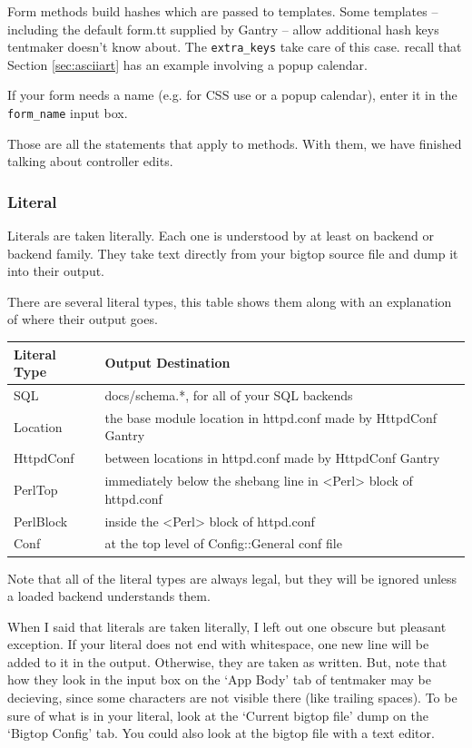 Form methods build hashes which are passed to templates.  Some templates --
including the default form.tt supplied by Gantry -- allow additional
hash keys tentmaker doesn't know about.  The \verb+extra_keys+ take care
of this case. recall that Section \ref{sec:asciiart} has an example involving
a popup calendar.

If your form needs a name (e.g. for CSS use or a popup calendar), enter
it in the \verb+form_name+ input box.

Those are all the statements that apply to methods.  With them, we have
finished talking about controller edits.

\subsubsection*{Literal}

Literals are taken literally.  Each one is understood by at least on backend
or backend family.  They take text directly from your bigtop source file
and dump it into their output.

There are several literal types, this table shows them along with an
explanation of where their output goes.

\begin{tabular}{l|l}
Literal Type & Output Destination \\
\hline
SQL       & docs/schema.*, for all of your SQL backends \\
Location  & the base module location in httpd.conf made by HttpdConf Gantry \\
HttpdConf & between locations in httpd.conf made by HttpdConf Gantry \\
PerlTop   & immediately below the shebang line in <Perl> block of httpd.conf \\
PerlBlock & inside the <Perl> block of httpd.conf \\
Conf      & at the top level of Config::General conf file \\
\end{tabular}

Note that all of the literal types are always legal, but they will be ignored
unless a loaded backend understands them.

When I said that literals are taken literally, I left out one obscure
but pleasant exception.  If your literal does not end with whitespace,
one new line will be added to it in the output.  Otherwise, they are
taken as written.  But, note that how they look in the input box on
the `App Body' tab of tentmaker may be decieving, since some characters
are not visible there (like trailing spaces).  To be sure of what is
in your literal, look at the `Current bigtop file' dump on the `Bigtop
Config' tab.  You could also look at the bigtop file with a text editor.

